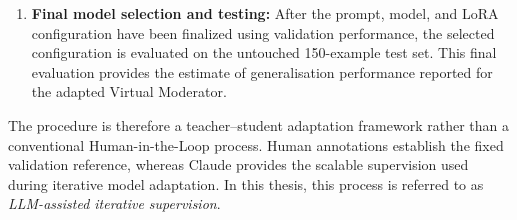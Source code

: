 \documentclass[11pt,a4paper]{article}
\begin{document}
\begin{enumerate}[nosep]
    \item \textbf{Final model selection and testing:}
    After the prompt, model, and LoRA configuration have been finalized using
    validation performance, the selected configuration is evaluated on the
    untouched 150-example test set. This final evaluation provides the estimate
    of generalisation performance reported for the adapted Virtual Moderator.
\end{enumerate}

The procedure is therefore a teacher--student adaptation framework rather than
a conventional Human-in-the-Loop process. Human annotations establish the
fixed validation reference, whereas Claude provides the scalable supervision
used during iterative model adaptation. In this thesis, this process is
referred to as \emph{LLM-assisted iterative supervision}.
\end{document}
